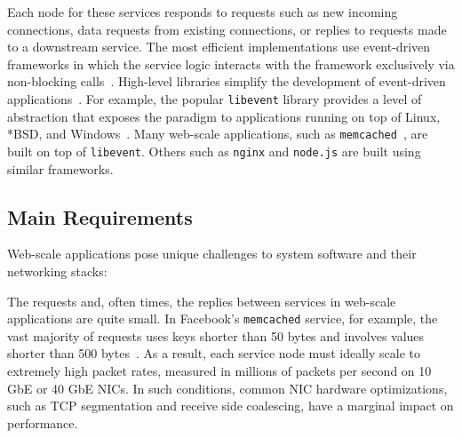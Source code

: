 Each node for these services responds to requests such as new incoming
connections, data requests from existing connections, or replies to
requests made to a downstream service.  The most efficient
implementations use event-driven frameworks in which the service logic
interacts with the framework exclusively via non-blocking
calls~\cite{DBLP:conf/usenix/PaiDZ99,DBLP:conf/sosp/WelshCB01}. %
High-level libraries simplify the development of event-driven
applications~\cite{provos2003libevent,libev,libuv}.  For example, the
popular \texttt{libevent} library provides a level of abstraction that
exposes the paradigm to applications running on top of Linux, *BSD,
and Windows~\cite{provos2003libevent}. Many web-scale applications,
such as \texttt{memcached}~\cite{url:memcached}, are built on top of
\texttt{libevent}.  Others such as \texttt{nginx} and \texttt{node.js} are built using
similar frameworks.


\subsection{Main Requirements}
\label{sec:motivation:challenges}

Web-scale applications pose unique challenges to system
software and their networking stacks:


 The requests and, often times, the
replies between services in web-scale applications are quite small. In
Facebook's \texttt{memcached} service, for example, the vast majority
of requests uses keys shorter than 50 bytes and involves values shorter
than 500 bytes~\cite{Atikoglu:2012:WAL}. As a result, each service
node must ideally scale to extremely high packet rates, measured in
millions of packets per second on 10 GbE or 40 GbE NICs.  In such
conditions, common NIC hardware optimizations, such as TCP
segmentation and receive side coalescing, have a marginal impact on
performance.

